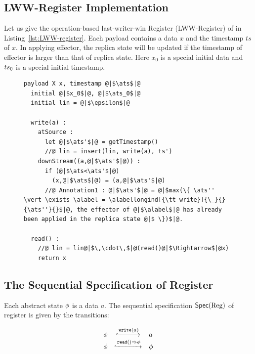 \subsection{LWW-Register Implementation}
\label{subsec:LWW-register implementation}

Let us give the operation-based last-writer-win Register (LWW-Register) of \cite{ShapiroPBZ11} in Listing~\ref{lst:LWW-register}. Each payload contains a data $x$ and the timestamp $ts$ of $x$. In applying effector, the replica state will be updated if the timestamp of effector is larger than that of replica state. Here $x_0$ is a special initial data and $\ats_0$ is a special initial timestamp.


\begin{figure}[t]
\begin{lstlisting}[frame=top,caption={Pseudo-code of LWW-register},
captionpos=b,label={lst:LWW-register}]
  payload X x, timestamp @|$\ats$|@
  initial @|$x_0$|@, @|$\ats_0$|@
  initial lin = @|$\epsilon$|@

  write(a) :
    atSource :
      let @|$\ats'$|@ = getTimestamp()
      //@ lin = insert(lin, write(a), ts')
    downStream((a,@|$\ats'$|@)) :
      if (@|$\ats<\ats'$|@)
        (x,@|$\ats$|@) = (a,@|$\ats'$|@)
      //@ Annotation1 : @|$\ats'$|@ = @|$max(\{ \ats'' \vert \exists \alabel = \alabellongind[{\tt write}]{\_}{}{\ats''}{}$|@, the effector of @|$\alabel$|@ has already been applied in the replica state @|$ \})$|@.

  read() :
    //@ lin = lin@|$\,\cdot\,$|@(read()@|$\Rightarrow$|@x)
    return x
\end{lstlisting}
\end{figure}



\subsection{The Sequential Specification of Register}
\label{subsec:the sequential specification of register}

Each abstract state $\abstate$ is a data $a$. The sequential specification $\specReg$ of register is given by the transitions:

\[
  \begin{array}{rcl}
    \abstate
    & \specarrow{\alabelshort[\mathtt{write}]{a}}
    & a\\
    \abstate
    & \specarrow{\alabellong[\mathtt{read}]{}{\abstate}{}}
    & \abstate
  \end{array}
\]

